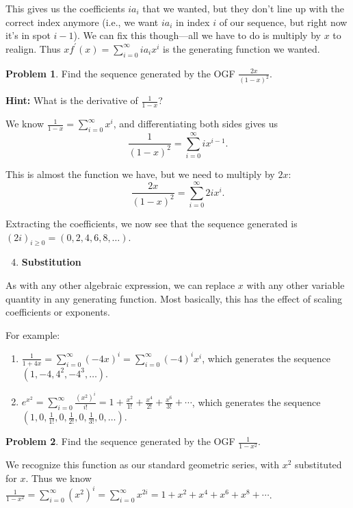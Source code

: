 \documentclass{article}
\theoremstyle{definition}
\newtheorem{problem}{Problem}
\begin{document}
This gives us the coefficients $i a_{i}$ that we wanted, but they don't line up with the correct index anymore (i.e., we want $i a_{i}$ in index $i$ of our sequence, but right now it's in spot $i-1$). We can fix this though---all we have to do is multiply by $x$ to realign. Thus $x f^{\prime}(x)=\sum_{i=0}^{\infty} i a_{i} x^{i}$ is the generating function we wanted.

\begin{problem}
Find the sequence generated by the OGF $\frac{2 x}{(1-x)^{2}}$.

\textbf{Hint:} What is the derivative of $\frac{1}{1-x}$?
\end{problem}

We know $\frac{1}{1-x}=\sum_{i=0}^{\infty} x^{i}$, and differentiating both sides gives us
\[\frac{1}{(1-x)^{2}}=\sum_{i=0}^{\infty} i x^{i-1}.\]

This is almost the function we have, but we need to multiply by $2 x$:
\[\frac{2 x}{(1-x)^{2}}=\sum_{i=0}^{\infty} 2 i x^{i}.\]

Extracting the coefficients, we now see that the sequence generated is $(2 i)_{i \geq 0}=(0,2,4,6,8, \ldots)$.

\begin{enumerate}
\setcounter{enumi}{3}
\item \textbf{Substitution}
\end{enumerate}

As with any other algebraic expression, we can replace $x$ with any other variable quantity in any generating function. Most basically, this has the effect of scaling coefficients or exponents.

For example:
\begin{enumerate}[label=(\alph*)]
\item $\frac{1}{1+4 x}=\sum_{i=0}^{\infty}(-4 x)^{i}=\sum_{i=0}^{\infty}(-4)^{i} x^{i}$, which generates the sequence $\left(1,-4,4^{2},-4^{3}, \ldots\right)$.
\item $e^{x^{2}}=\sum_{i=0}^{\infty} \frac{\left(x^{2}\right)^{i}}{i!}=1+\frac{x^{2}}{1!}+\frac{x^{4}}{2!}+\frac{x^{6}}{3!}+\cdots$, which generates the sequence $\left(1,0, \frac{1}{1!}, 0, \frac{1}{2!}, 0, \frac{1}{3!}, 0, \ldots\right)$.
\end{enumerate}

\begin{problem}
Find the sequence generated by the OGF $\frac{1}{1-x^{2}}$.
\end{problem}

We recognize this function as our standard geometric series, with $x^{2}$ substituted for $x$. Thus we know $\frac{1}{1-x^{2}}=\sum_{i=0}^{\infty}\left(x^{2}\right)^{i}=\sum_{i=0}^{\infty} x^{2 i}=1+x^{2}+x^{4}+x^{6}+x^{8}+\cdots$.
\end{document}

